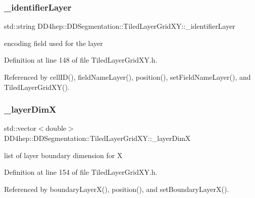 \subsubsection{\texorpdfstring{\+\_\+identifier\+Layer}{\_identifierLayer}}
{\footnotesize\ttfamily std\+::string D\+D4hep\+::\+D\+D\+Segmentation\+::\+Tiled\+Layer\+Grid\+X\+Y\+::\+\_\+identifier\+Layer\hspace{0.3cm}{\ttfamily [protected]}}



encoding field used for the layer 



Definition at line 148 of file Tiled\+Layer\+Grid\+X\+Y.\+h.



Referenced by cell\+I\+D(), field\+Name\+Layer(), position(), set\+Field\+Name\+Layer(), and Tiled\+Layer\+Grid\+X\+Y().

\hypertarget{class_d_d4hep_1_1_d_d_segmentation_1_1_tiled_layer_grid_x_y_a6ce81c79c43efdb092b454a1047fd666}{}\label{class_d_d4hep_1_1_d_d_segmentation_1_1_tiled_layer_grid_x_y_a6ce81c79c43efdb092b454a1047fd666} 
\subsubsection{\texorpdfstring{\+\_\+layer\+DimX}{\_layerDimX}}
{\footnotesize\ttfamily std\+::vector$<$double$>$ D\+D4hep\+::\+D\+D\+Segmentation\+::\+Tiled\+Layer\+Grid\+X\+Y\+::\+\_\+layer\+DimX\hspace{0.3cm}{\ttfamily [protected]}}



list of layer boundary dimension for X 



Definition at line 154 of file Tiled\+Layer\+Grid\+X\+Y.\+h.



Referenced by boundary\+Layer\+X(), position(), and set\+Boundary\+Layer\+X().

\hypertarget{class_d_d4hep_1_1_d_d_segmentation_1_1_tiled_layer_grid_x_y_a6974df570df9c6cd533b17a78f3cb0d3}{}\label{class_d_d4hep_1_1_d_d_segmentation_1_1_tiled_layer_grid_x_y_a6974df570df9c6cd533b17a78f3cb0d3} 
